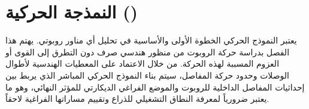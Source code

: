 \chapter{النمذجة الحركية ()}
\label{ch:kinematics}

يعتبر النموذج الحركي الخطوة الأولى والأساسية في تحليل أي مناور روبوتي. يهتم هذا الفصل بدراسة حركة الروبوت من منظور هندسي صرف دون التطرق إلى القوى أو العزوم المسببة لهذه الحركة. من خلال الاعتماد على المعطيات الهندسية لأطوال الوصلات وحدود حركة المفاصل، سيتم بناء النموذج الحركي المباشر الذي يربط بين إحداثيات المفاصل الداخلية للروبوت والموضع الفراغي الديكارتي للمؤثر النهائي، وهو ما يعتبر ضرورياً لمعرفة النطاق التشغيلي للذراع وتقييم مساراتها الفراغية لاحقاً.






